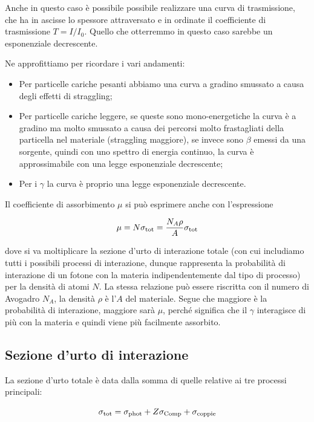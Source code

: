 Anche in questo caso è possibile possibile realizzare una curva di trasmissione, che ha in ascisse lo spessore attraversato e in ordinate il coefficiente di trasmissione $T=I/I_0$. Quello che otterremmo in questo caso sarebbe un esponenziale decrescente.

Ne approfittiamo per ricordare i vari andamenti:

\begin{itemize}
    \item Per particelle cariche pesanti abbiamo una curva a gradino smussato a causa degli effetti di straggling;
    \item Per particelle cariche leggere, se queste sono mono-energetiche la curva è a gradino ma molto smussato a causa dei percorsi molto frastagliati della particella nel materiale (straggling maggiore), se invece sono $\beta$ emessi da una sorgente, quindi con uno spettro di energia continuo, la curva è approssimabile con una legge esponenziale decrescente;
    \item Per i $\gamma$ la curva è proprio una legge esponenziale decrescente.
\end{itemize}

Il coefficiente di assorbimento $\mu$ si può esprimere anche con l'espressione

\begin{equation*}
    \mu=N \sigma_{\rm tot}
    =\frac{N_A \rho}{A} \sigma_{\rm tot}
\end{equation*}

dove si va moltiplicare la sezione d'urto di interazione totale (con cui includiamo tutti i possibili processi di interazione, dunque rappresenta la probabilità di interazione di un fotone con la materia indipendentemente dal tipo di processo) per la densità di atomi $N$. La stessa relazione può essere riscritta con il numero di Avogadro $N_A$, la densità $\rho$ è l'$A$ del materiale. Segue che maggiore è la probabilità di interazione, maggiore sarà $\mu$, perché significa che il $\gamma$ interagisce di più con la materia e quindi viene più facilmente assorbito.

\subsection{Sezione d'urto di interazione}

La sezione d'urto totale è data dalla somma di quelle relative ai tre processi principali:

\begin{equation*}
    \sigma_{\rm tot}
    =\sigma_{\rm phot} + Z \sigma_{\rm Comp} + \sigma_{\rm coppie}
\end{equation*}

